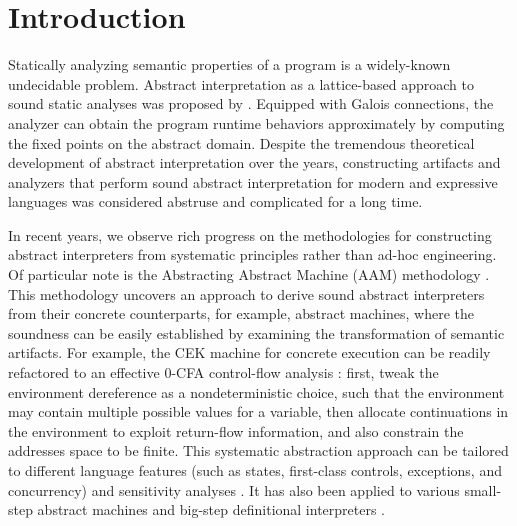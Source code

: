 \section{Introduction} \label{intro}

Statically analyzing semantic properties of a program is a
widely-known undecidable problem. Abstract interpretation as a
lattice-based approach to sound static analyses was proposed by
\citet{DBLP:conf/popl/CousotC77}. Equipped with Galois connections,
the analyzer can obtain the program runtime behaviors approximately by
computing the fixed points on the abstract domain. Despite the
tremendous theoretical development of abstract interpretation over the
years, constructing artifacts and analyzers that perform sound
abstract interpretation for modern and expressive languages was
considered abstruse and complicated for a long time.

In recent years, we observe rich progress on the methodologies for
constructing abstract interpreters from systematic principles rather than
ad-hoc engineering. Of particular note is the Abstracting Abstract
Machine (AAM) methodology \cite{DBLP:journals/jfp/HornM12,
  DBLP:conf/icfp/HornM10}. This methodology uncovers an approach to derive sound
abstract interpreters from their concrete counterparts, for example,
abstract machines, where the soundness can be easily established by
examining the transformation of semantic artifacts. For example, the
CEK machine \cite{DBLP:conf/popl/FelleisenF87} for concrete execution
can be readily refactored to an effective $0$-CFA control-flow
analysis \cite{Shivers:1988:CFA:53990.54007,
  Midtgaard:2012:CAF:2187671.2187672}: first, tweak the environment
dereference as a nondeterministic choice, such that the environment
may contain multiple possible values for a variable, then allocate
continuations in the environment to exploit return-flow information,
and also constrain the addresses space to be finite.  This systematic
abstraction approach can be tailored to different language features
(such as states, first-class controls, exceptions, and concurrency) and
sensitivity analyses \cite{DBLP:conf/icfp/Gilray0M16,
  DBLP:conf/popl/GilrayL0MH16, Darais:2015:GTM:2814270.2814308}. It
has also been applied to various small-step abstract machines
\cite{DBLP:journals/jfp/HornM12, DBLP:conf/icfp/HornM10,
  Sergey:2013:MAI:2491956.2491979} and big-step definitional
interpreters \cite{Wei:2018:RAA:3243631.3236800,
  DBLP:journals/pacmpl/DaraisLNH17, Keidel:2018:CSP:3243631.3236767}.

